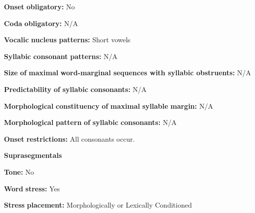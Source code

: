 \documentclass[output=paper]{langsci/langscibook}
\begin{document}
\begin{styleBody}
\textbf{Onset} \textbf{obligatory:} No
\end{styleBody}

\begin{styleBody}
\textbf{Coda} \textbf{obligatory:} N/A
\end{styleBody}

\begin{styleBody}
\textbf{Vocalic} \textbf{nucleus} \textbf{patterns:} Short vowels
\end{styleBody}

\begin{styleBody}
\textbf{Syllabic} \textbf{consonant} \textbf{patterns:} N/A
\end{styleBody}

\begin{styleBody}
\textbf{Size} \textbf{of} \textbf{maximal} \textbf{word{}-marginal sequences with syllabic obstruents:} N/A
\end{styleBody}

\begin{styleBody}
\textbf{Predictability} \textbf{of} \textbf{syllabic} \textbf{consonants:} N/A
\end{styleBody}

\begin{styleBody}
\textbf{Morphological} \textbf{constituency} \textbf{of} \textbf{maximal} \textbf{syllable} \textbf{margin:} N/A
\end{styleBody}

\begin{styleBody}
\textbf{Morphological} \textbf{pattern} \textbf{of} \textbf{syllabic} \textbf{consonants:} N/A
\end{styleBody}

\begin{styleBody}
\textbf{Onset} \textbf{restrictions:} All consonants occur.
\end{styleBody}

\begin{styleBody}
\textbf{Suprasegmentals}
\end{styleBody}

\begin{styleBody}
\textbf{Tone:} No
\end{styleBody}

\begin{styleBody}
\textbf{Word} \textbf{stress:} Yes
\end{styleBody}

\begin{styleBody}
\textbf{Stress} \textbf{placement:} Morphologically or Lexically Conditioned
\end{styleBody}
\end{document}
